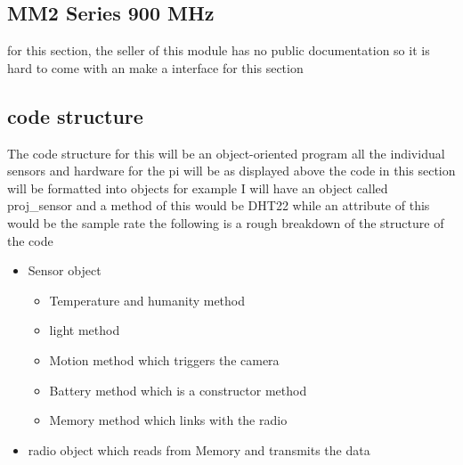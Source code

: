 	\subsection{MM2 Series 900 MHz}
	for this section, the seller of this module has no public  documentation so it is hard to  come  with  an make a  interface for  this section   
	\subsection{code structure}
	The code structure for this  will be an object-oriented program all the individual sensors and  hardware  for the pi will be as displayed above the code in this section will be formatted into objects for example I will have an  object   called proj\_sensor and  a method of this  would be  DHT22 while an attribute of this would  be  the  sample rate
	the following is a  rough breakdown of the  structure of the code
	\begin{itemize}
		\item Sensor object
		
		\begin{itemize}
			\item Temperature and humanity method
			\item light method
			\item Motion method which triggers the camera
			\item Battery method which is a constructor method
			\item Memory method which  links with the radio 
		
		\end{itemize}
		
		\item radio object which reads from Memory and  transmits the data 
	
	\end{itemize}
